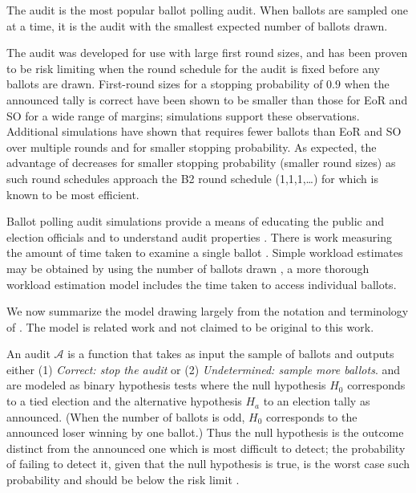 The \BRAVO audit \cite{bravo} is the most popular ballot polling audit. When ballots are sampled one at a time, it is the audit with the smallest expected number of ballots drawn. 

The \Minerva audit \cite{usenix_minerva,arxiv_athena} was developed for use with large first round sizes, and has been proven to be risk limiting when the round schedule for the audit is fixed before any ballots are drawn. First-round sizes for a stopping probability of $0.9$ when the announced tally is correct have been shown to be smaller than those for EoR and SO \BRAVO for a wide range of margins; simulations \cite{arxiv_athena} support these observations. Additional simulations \cite{simulations} have shown that \Minerva requires fewer ballots than EoR and SO \BRAVO over multiple rounds and for smaller stopping probability. As expected, the advantage of \Minerva decreases for smaller stopping probability (smaller round sizes) as such round schedules approach the B2 round schedule (1,1,1,\ldots) for which \BRAVO is known to be most efficient.

Ballot polling audit simulations provide a means of educating the public and election officials \cite{dice} and to understand audit properties \cite{mclaughlin_thesis,simulations_house, blom_IRV, DBLP:conf/evoteid/HuangRSTV20}. There is work measuring the amount of time taken to examine a single ballot \cite{RI-report}. 
Simple workload estimates may be obtained by using the number of ballots drawn \cite{bernoulli-ballot-polling}, a more thorough workload estimation model includes the time taken to access individual ballots\cite{bernhard-diss}. 

We now summarize the model drawing largely from the notation and terminology of \cite{usenix_minerva,arxiv_athena,simulations,bravo}. The model is related work and not claimed to be original to this work. 

An audit $\mathcal{A}$ is a function that takes as input the sample of ballots and outputs either (1) \emph{Correct: stop the audit} or (2) \emph{Undetermined: sample more ballots}.
\BRAVO and \Minerva are modeled as binary hypothesis tests where the null hypothesis $H_0$ corresponds to a tied election and the alternative hypothesis $H_a$ to an election tally as announced. 
(When the number of ballots is odd, $H_0$ corresponds to the announced loser winning by one ballot.)
Thus the null hypothesis is the outcome distinct from the announced one which is most difficult to detect; the probability of failing to detect it, given that the null hypothesis is true, is the worst case such probability and should be below the risk limit \cite{Bayesian-RLA}.


